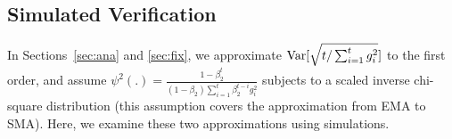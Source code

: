 
\subsection{Simulated Verification}

In Sections~\ref{sec:ana} and \ref{sec:fix}, we approximate $\operatorname{{\rm Var}}[\sqrt{t/\sum_{i=1}^t g_i^2}]$ to the first order, and assume $\psi^2(.) = \frac{1-\beta_2^t}{(1 - \beta_2)\sum_{i = 1}^t \beta_2^{t-i}g_i^2}$ subjects to a scaled inverse chi-square distribution (this assumption covers the approximation from EMA to SMA).
Here, we examine these two approximations using simulations.

